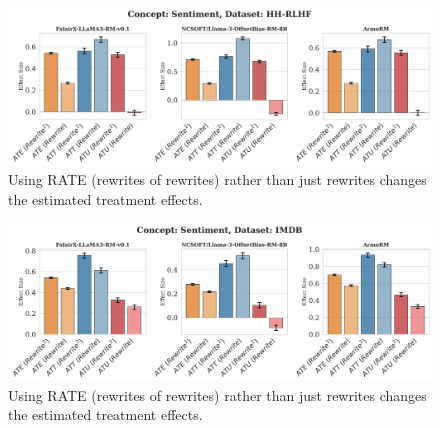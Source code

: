 \documentclass{article}
\begin{document}
\begin{figure}[H]
  \centering
  \includegraphics[width=\linewidth]{figures/comp5.png}
  \caption{Using RATE (rewrites of rewrites) rather than just rewrites changes the estimated treatment effects.}
  \label{fig:Sentiment-HHRLHF}
\end{figure}
\begin{figure}[H]
  \centering
  \includegraphics[width=\linewidth]{figures/comp6.png}
  \caption{Using RATE (rewrites of rewrites) rather than just rewrites changes the estimated treatment effects.}
  \label{fig:Sentiment-IMDB}
\end{figure}
\end{document}
